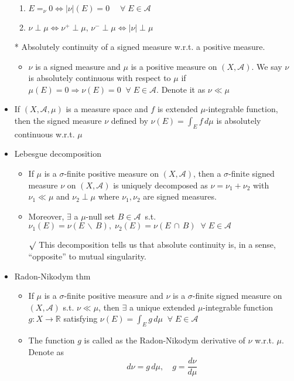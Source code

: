 \documentclass[12pt]{article}
\newcommand{\rmk}{$\surd$}
\newcommand{\R}{\mathbb{R}}
\newcommand{\A}{\mathcal{A}}
\newcommand{\diff}{\, \backslash \,}
\newcommand{\forany}{\; \forall \;}
\newcommand{\intersect}{\,\cap\,}
\begin{document}
\begin{itemize}
\begin{enumerate}
        \item $E=_\nu 0 \Leftrightarrow |\nu|(E)=0 \quad \forany E\in \A$
        \item $\nu\perp \mu \Leftrightarrow \nu^+\perp \mu, \, \nu^-\perp \mu\Leftrightarrow |\nu|\perp \mu$ 
    \end{enumerate}
    \item[*] Absolutely continuity of a signed measure w.r.t. a positive measure.
    \begin{itemize}
        \item $\nu$ is a signed measure and $\mu$ is a positive measure on $(X, \A)$. We say $\nu$ is absolutely continuous with respect to $\mu$ if $\mu(E)=0\Rightarrow \nu(E)=0\; \forany E\in \A$. Denote it as $\nu \ll \mu$
    \end{itemize}
    \item If $(X, \A, \mu)$ is a measure space and $f$ is extended $\mu$-integrable function, then the signed measure $\nu$ defined by $\nu(E)=\int_E f\, d\mu$ is absolutely continuous w.r.t. $\mu$
    \item Lebesgue decomposition
    \begin{itemize}
        \item If $\mu$ is a $\sigma$-finite positive measure on $(X, \A)$, then a $\sigma$-finite signed measure $\nu$ on $(X, \A)$ is uniquely decomposed as $\nu=\nu_1+\nu_2$ with $\nu_1\ll \mu$ and $\nu_2 \perp \mu$ where $\nu_1, \nu_2$ are signed measures. 
        \item Moreover, $\exists$ a $\mu$-null set $B\in \A$\, s.t. $\nu_1(E)=\nu(E\diff B), \;\nu_2(E)=\nu(E\intersect B)\; \forany E\in \A$ 
        \item[\rmk] This decomposition tells us that absolute continuity is, in a sense, ``opposite'' to mutual singularity. 
    \end{itemize}
    \item Radon-Nikodym thm
    \begin{itemize}
        \item If $\mu$ is a $\sigma$-finite positive measure and $\nu$ is a $\sigma$-finite signed measure on $(X, \A)$ s.t. $\nu\ll\mu$, then $\exists$ a unique extended $\mu$-integrable function $g:X\rightarrow \R$ satisfying $\nu(E)=\int_E g\, d\mu \; \forany E\in \A$
        \item The function $g$ is called as the Radon-Nikodym derivative of $\nu$ w.r.t. $\mu$.  Denote as  $$d\nu= g \, d\mu ,\quad g=\frac{d\nu}{d\mu}$$
    \end{itemize}

\end{itemize}
\end{document}
